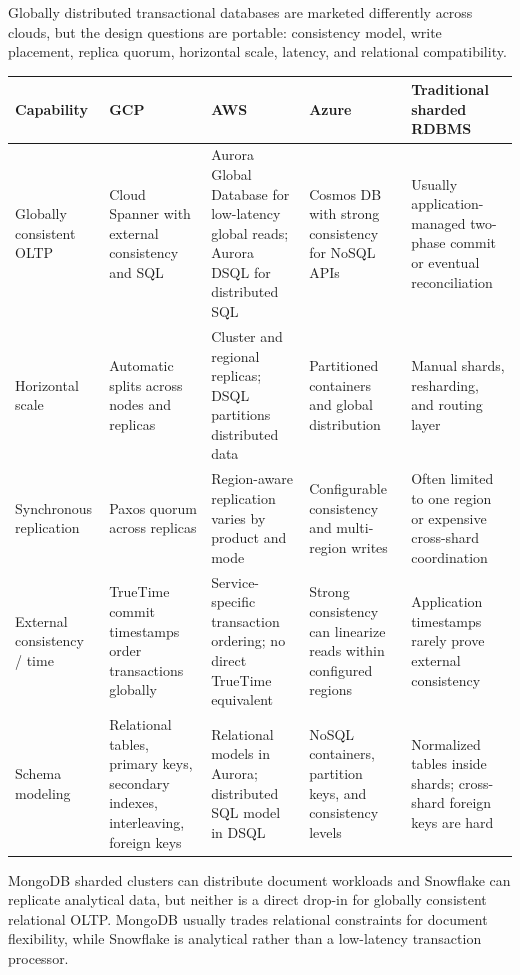 \begin{crosscloud}
Globally distributed transactional databases are marketed differently across clouds, but the design questions are portable: consistency model, write placement, replica quorum, horizontal scale, latency, and relational compatibility.

\vspace{2mm}
{\footnotesize
\begin{tabular}{@{}p{2.5cm}p{2.7cm}p{2.7cm}p{2.7cm}p{2.7cm}@{}}
\toprule
\textbf{Capability} & \textbf{GCP} & \textbf{AWS} & \textbf{Azure} & \textbf{Traditional sharded RDBMS} \\
\midrule
Globally consistent OLTP & Cloud Spanner with external consistency and SQL & Aurora Global Database for low-latency global reads; Aurora DSQL for distributed SQL & Cosmos DB with strong consistency for NoSQL APIs & Usually application-managed two-phase commit or eventual reconciliation \\
Horizontal scale & Automatic splits across nodes and replicas & Cluster and regional replicas; DSQL partitions distributed data & Partitioned containers and global distribution & Manual shards, resharding, and routing layer \\
Synchronous replication & Paxos quorum across replicas & Region-aware replication varies by product and mode & Configurable consistency and multi-region writes & Often limited to one region or expensive cross-shard coordination \\
External consistency / time & TrueTime commit timestamps order transactions globally & Service-specific transaction ordering; no direct TrueTime equivalent & Strong consistency can linearize reads within configured regions & Application timestamps rarely prove external consistency \\
Schema modeling & Relational tables, primary keys, secondary indexes, interleaving, foreign keys & Relational models in Aurora; distributed SQL model in DSQL & NoSQL containers, partition keys, and consistency levels & Normalized tables inside shards; cross-shard foreign keys are hard \\
\bottomrule
\end{tabular}}

\vspace{1mm}
MongoDB sharded clusters can distribute document workloads and Snowflake can replicate analytical data, but neither is a direct drop-in for globally consistent relational OLTP. MongoDB usually trades relational constraints for document flexibility, while Snowflake is analytical rather than a low-latency transaction processor.
\end{crosscloud}

